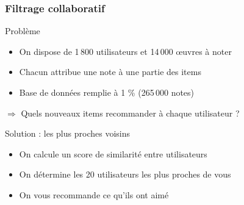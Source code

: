 \documentclass[handout]{beamer}
\begin{document}
\begin{frame}
	\frametitle{Filtrage collaboratif}
	\begin{block}{Problème}
		\begin{itemize}
		\item On dispose de 1\,800 utilisateurs et 14\,000 œuvres à noter
		\item Chacun attribue une note à une \alert{partie} des items
		\item Base de données remplie à 1 \% (265\,000 notes)
		\end{itemize}
		$\Rightarrow$ Quels nouveaux items recommander à chaque utilisateur ?
	\end{block}
	\pause
	\begin{exampleblock}{Solution : les plus proches voisins}
		\begin{itemize}[<+->]
		\item On calcule un score de similarité entre utilisateurs
		\item On détermine les 20 utilisateurs les plus proches de vous
		\item On vous recommande ce qu'ils ont aimé
		\end{itemize}
	\end{exampleblock}
\end{frame}

\def\R{\mathcal{R}}
\def\N{N}

\end{document}
